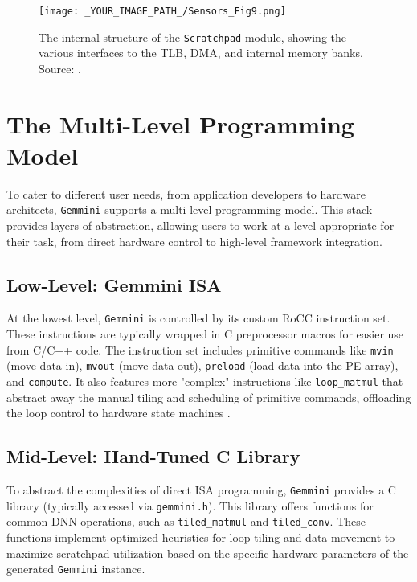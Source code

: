 \begin{figure}[htbp]
    \centering
    \texttt{[image: \_YOUR\_IMAGE\_PATH\_/Sensors\_Fig9.png]}
    \caption{The internal structure of the \texttt{Scratchpad} module, showing the various interfaces to the TLB, DMA, and internal memory banks. Source: \cite{gookyi2023gemmini_case_study}.}
    \label{fig:scratchpad_module}
\end{figure}

\section{The Multi-Level Programming Model}
\label{sec:gemmini_programming_model}

To cater to different user needs, from application developers to hardware architects, \texttt{Gemmini} supports a multi-level programming model. This stack provides layers of abstraction, allowing users to work at a level appropriate for their task, from direct hardware control to high-level framework integration.

\subsection{Low-Level: Gemmini ISA}
At the lowest level, \texttt{Gemmini} is controlled by its custom RoCC instruction set. These instructions are typically wrapped in C preprocessor macros for easier use from C/C++ code. The instruction set includes primitive commands like \texttt{mvin} (move data in), \texttt{mvout} (move data out), \texttt{preload} (load data into the PE array), and \texttt{compute}. It also features more "complex" instructions like \texttt{loop\_matmul} that abstract away the manual tiling and scheduling of primitive commands, offloading the loop control to hardware state machines \cite{Genc2022GemminiMLSys}.

\subsection{Mid-Level: Hand-Tuned C Library}
To abstract the complexities of direct ISA programming, \texttt{Gemmini} provides a C library (typically accessed via \texttt{gemmini.h}). This library offers functions for common DNN operations, such as \texttt{tiled\_matmul} and \texttt{tiled\_conv}. These functions implement optimized heuristics for loop tiling and data movement to maximize scratchpad utilization based on the specific hardware parameters of the generated \texttt{Gemmini} instance.

